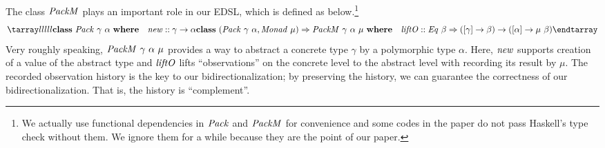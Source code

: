 \documentclass{article}
\theoremstyle{definition}
\begin{document}
The class $\mathit{PackM}$ plays an important role in our EDSL, 
which is defined as below.\footnote{We actually use functional dependencies 
in $\mathit{Pack}$ and $\mathit{PackM}$ for convenience and some codes in the paper do not pass Haskell's type check without them. We ignore them for a while because they are the point of our paper.}
\[
\bb
 \key{class}~\mi{Pack}~\gamma~\alpha~\key{where} \\
 \quad \mi{new} :: \gamma \to \alpha \\
 \key{class}~(\mi{Pack}~\gamma~\alpha, \mi{Monad}~\mu) \Rightarrow \mi{PackM}~\gamma~\alpha~\mu~\key{where}\\
 \quad \mi{liftO} :: \mi{Eq}~\beta \Rightarrow ([\gamma] \to \beta) \to ([\alpha] \to \mu~\beta)
\ee
\]
Very roughly speaking, $\mathit{PackM}~\gamma~\alpha~\mu$ provides a way
to abstract a concrete type $\gamma$ by a polymorphic type $\alpha$.
Here, $\mathit{new}$ supports creation of a value of the abstract type and 
$\mathit{liftO}$ lifts ``observations'' on the concrete level to 
the abstract level with recording its result by $\mu$. 
The recorded observation history is the key to our bidirectionalization;
by preserving the history, we can guarantee the correctness of our bidirectionalization. That is, the history is ``complement''. 


\end{document}
